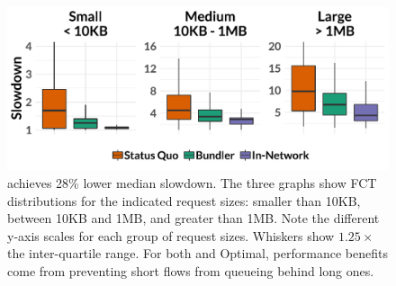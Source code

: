 \begin{figure}
    \centering
\begin{knitrout}
\color{fgcolor}
\includegraphics[width=\maxwidth]{figure/eval:best-1} 

\end{knitrout}
    \caption{\name achieves 28\% lower median slowdown. The three graphs show FCT distributions for the indicated request sizes: smaller than 10KB, between 10KB and 1MB, and greater than 1MB.  Note the different y-axis scales for each group of request sizes. Whiskers show $1.25 \times$ the inter-quartile range. For both \name and Optimal, performance benefits come from preventing short flows from queueing behind long ones. }
    \label{fig:eval:best}
\end{figure}
\newcommand{\overviewBenefitsBaselineMedian}{1.76\xspace}
\newcommand{\overviewBenefitsBaselineTail}{79.37\xspace}
\newcommand{\overviewBenefitsBundlerMedian}{1.26\xspace}
\newcommand{\overviewBenefitsBundlerTail}{41.38\xspace}
\newcommand{\overviewBenefitsOptimalMedian}{1.07\xspace}
\newcommand{\overviewBenefitsOptimalTail}{27.49\xspace}
\newcommand{\overviewBenefitsBundlerMedianImprovement}{28\%\xspace}
